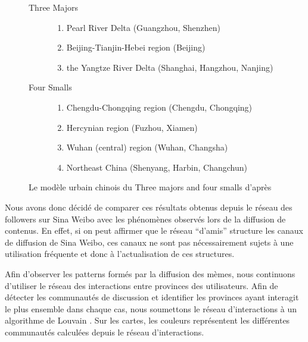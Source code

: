 \begin{figure}[h!]
    \centering
    
    \begin{description}
    \item[Three Majors]
      \begin{enumerate}
      \item Pearl River Delta (Guangzhou, Shenzhen)
      \item Beijing-Tianjin-Hebei region (Beijing)
      \item the Yangtze River Delta (Shanghai, Hangzhou, Nanjing)
      \end{enumerate}

    \item[Four Smalls]
      \begin{enumerate}
      \item Chengdu-Chongqing region (Chengdu, Chongqing)
      \item Hercynian region (Fuzhou, Xiamen)
      \item Wuhan (central) region (Wuhan, Changsha)
      \item Northeast China (Shenyang, Harbin, Changchun)
      \end{enumerate}

    \end{description}

   \caption{
      Le mod\`ele urbain chinois du Three majors and four smalls d{\textquoteright}apr\`es \cite{Zhen2013}
    }
\end{figure}

Nous avons donc d\'ecid\'e de comparer ces r\'esultats obtenus depuis le r\'eseau des followers sur Sina Weibo avec les ph\'enom\`enes observ\'es lors de la diffusion de contenus. En effet, si on peut affirmer que le r\'eseau {\textquotedblleft}d{\textquoteright}amis{\textquotedblright} structure les canaux de diffusion de Sina Weibo, ces canaux ne sont pas n\'ecessairement sujets \`a une utilisation fr\'equente et donc \`a l{\textquoteright}actualisation de ces structures. 

Afin d{\textquoteright}observer les patterns form\'es par la diffusion des m\`emes, nous continuons d{\textquoteright}utiliser le r\'eseau des interactions entre provinces des utilisateurs. Afin de d\'etecter les communaut\'es de discussion et identifier les provinces ayant interagit le plus ensemble dans chaque cas, nous soumettons le r\'eseau d{\textquoteright}interactions \`a un algorithme de Louvain \citep{Blondel2008}. Sur les cartes, les couleurs repr\'esentent les diff\'erentes communaut\'es calcul\'ees depuis le r\'eseau d{\textquoteright}interactions. 

